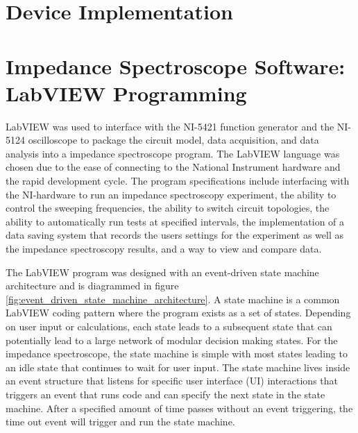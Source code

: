 \section{Device Implementation}


\section[IS Software]{Impedance Spectroscope Software: LabVIEW Programming}
\par LabVIEW was used to interface with the NI-5421 function generator and the NI-5124 oscilloscope to package the circuit model, data acquisition, and data analysis into a impedance spectroscope program. The LabVIEW language was chosen due to the ease of connecting to the National Instrument hardware and the rapid development cycle. The program specifications include interfacing with the NI-hardware to run an impedance spectroscopy experiment, the ability to control the sweeping frequencies, the ability to switch circuit topologies, the ability to automatically run tests at specified intervals, the implementation of a data saving system that records the users settings for the experiment as well as the impedance spectroscopy results, and a way to view and compare data.

\par The LabVIEW program was designed with an event-driven state machine architecture and is diagrammed in figure \ref{fig:event_driven_state_machine_architecture}. A state machine is a common LabVIEW coding pattern where the program exists as a set of states. Depending on user input or calculations, each state leads to a subsequent state that can potentially lead to a large network of modular decision making states. For the impedance spectroscope, the state machine is simple with most states leading to an idle state that continues to wait for user input. The state machine lives inside an event structure that listens for specific user interface (UI) interactions that triggers an event that runs code and can specify the next state in the state machine. After a specified amount of time passes without an event triggering, the time out event will trigger and run the state machine.    

